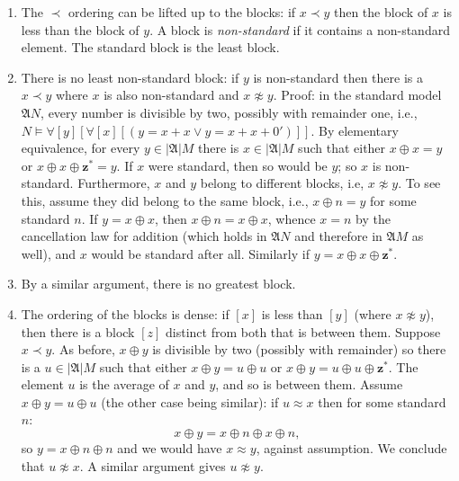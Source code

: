 \documentclass[10pt,a4paper]{article}
\theoremstyle{plain}
\theoremstyle{definition}
\theoremstyle{remark}
\providecommand{\lforall}{\mathord{\forall}}
\providecommand{\Obj}{}
\providecommand{\Struct}{\ensuremath{\mathfrak{A}}}
\providecommand{\Domain}{\ensuremath{|\mathfrak{A}|}}
\providecommand{\Sat}[2]{\ensuremath{#1 \models #2}}
\begin{document}
\begin{enumerate}
  impossible because it implies $x \approx y$, so $x \prec
  y$. Similarly, if $x \prec y$ and $x \not\approx y$, then $x \prec
  {^*y}$. Therefore if $x \prec y$ and $x \not\approx y$, then every
  $w \approx x$ is $\prec$-less than every $v \approx y$. Accordingly,
  each block $[x]$ forms a doubly infinite chain
  \[
  \cdots \prec  {^{**}x} \prec {^*}x \prec x \prec x^* \prec x^{**}
  \prec \cdots
  \]
  which is referred to as a $Z$-chain because it has the order type of
  the integers.
\item The $\prec$ ordering can be lifted up to the blocks: if $x \prec y$
  then the block of $x$ is less than the block of $y$. A block is
  \emph{non-standard} if it contains a non-standard element. The
  standard block is the least block. 
\item There is no least non-standard block: if $y$ is non-standard
  then there is a $x \prec y$ where $x$ is also non-standard and $x
  \not\approx y$. Proof: in the standard model $\Struct{N}$, every
  number is divisible by two, possibly with remainder one, i.e.,
  $\Sat{N}{\lforall[y][\lforall[x][(y = x + x \lor y = x + x +
        \Obj{0}')]]}$. By elementary equivalence, for every $y \in
  \Domain{M}$ there is $x \in \Domain{M}$ such that either $x \oplus x
  = y$ or $x \oplus x \oplus \mathbf{z}^*= y$. If $x$ were standard,
  then so would be $y$; so $x$ is non-standard. Furthermore, $x$ and
  $y$ belong to different blocks, i.e, $x \not\approx y$.  To see
  this, assume they did belong to the same block, i.e., $x \oplus n =
  y$ for some standard $n$. If $y = x \oplus x$, then $x \oplus n = x
  \oplus x$, whence $x = n$ by the cancellation law for addition
  (which holds in $\Struct{N}$ and therefore in $\Struct{M}$ as well),
  and $x$ would be standard after all. Similarly if $y = x \oplus x
  \oplus \mathbf{z}^*$.
\item By a similar argument, there is no greatest block. 
\item The ordering of the blocks is dense: if $[x]$ is less than $[y]$
  (where $x \not\approx y$), then there is a block $[z]$ distinct from
  both that is between them. Suppose $x \prec y$. As before, $x \oplus
  y$ is divisible by two (possibly with remainder) so there is a $u
  \in \Domain{M}$ such that either $x \oplus y = u \oplus u$ or $x
  \oplus y = u \oplus u \oplus \mathbf{z}^*$. The element $u$ is the
  average of $x$ and $y$, and so is between them. Assume $x \oplus y =
  u \oplus u$ (the other case being similar): if $u \approx x$ then
  for some standard $n$:
  \[
  x \oplus y = x \oplus n \oplus x \oplus n,
  \]
  so $y = x \oplus n \oplus n$ and we would have $x \approx y$,
  against assumption. We conclude that $u \not\approx x$. A similar
  argument gives $u \not\approx y$.
\end{enumerate}
\end{document}
